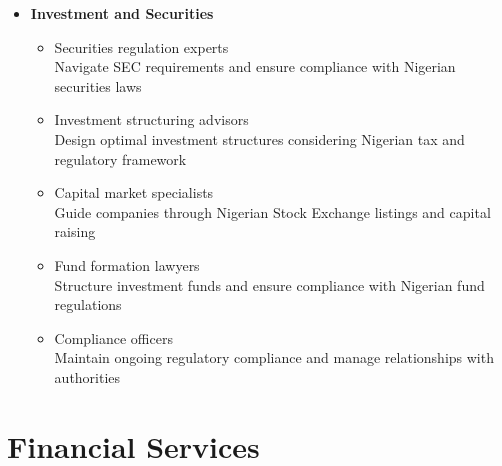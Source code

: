 \begin{tcolorbox}[
    colback=white,
    colframe=primarydark,
    title=\textbf{Legal Service Categories},
    before skip=1em,
    after skip=1em
]
\begin{itemize}[leftmargin=*,itemsep=0.5em]
        \vspace{0.5em}

        \item \textbf{Investment and Securities}
        \begin{itemize}[itemsep=0.3em]
            \item Securities regulation experts \\
                \small{Navigate SEC requirements and ensure compliance with Nigerian securities laws}
            \item Investment structuring advisors \\
                \small{Design optimal investment structures considering Nigerian tax and regulatory framework}
            \item Capital market specialists \\
                \small{Guide companies through Nigerian Stock Exchange listings and capital raising}
            \item Fund formation lawyers \\
                \small{Structure investment funds and ensure compliance with Nigerian fund regulations}
            \item Compliance officers \\
                \small{Maintain ongoing regulatory compliance and manage relationships with authorities}
        \end{itemize}
    \end{itemize}
\end{tcolorbox}

\section{Financial Services}\label{sec:financial-services}
\vspace{1em}

